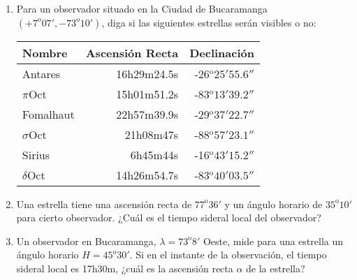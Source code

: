 \documentclass[a4paper,12pt]{article}
\begin{document}
\begin{enumerate}
  \item Para un observador situado en la Ciudad de Bucaramanga $(+7^\mathrm{o}
    07',-73^\mathrm{o} 10')$, diga si las siguientes estrellas serán visibles o
    no:\\

    \begin{center}
    \begin{tabular}{lrr}
      \hline
      {\bf Nombre} & {\bf Ascensión Recta} & {\bf Declinación} \\
      \hline
      Antares     & 16h29m24.5s     & -26$^\mathrm{o}25'55.6''$ \\ 
      $\pi$Oct    & 15h01m51.2s     & -83$^\mathrm{o}13'39.2''$ \\
      Fomalhaut  & 22h57m39.9s     & -29$^\mathrm{o}37'22.7''$ \\
      $\sigma$Oct & 21h08m47s       & -88$^\mathrm{o}57'23.1''$ \\
      Sirius      & 6h45m44s        & -16$^\mathrm{o}43'15.2''$ \\
      $\delta$Oct & 14h26m54.7s     & -83$^\mathrm{o}40'03.5''$ \\
      \hline
    \end{tabular}
    \end{center}

  \item Una estrella tiene una ascensión recta de $77^\mathrm{o}36'$ y un
    ángulo horario de $35^\mathrm{o}10'$ para cierto observador. ¿Cuál es el
    tiempo sideral local del observador?

  \item Un observador en Bucaramanga, $\lambda=73^\mathrm{o} 8'$ Oeste, mide para una estrella un ángulo horario $H=45^\mathrm{o}30'$. Si en el instante de la observación, el tiempo sideral local es 17h30m, ¿cuál es la ascensión recta $\alpha$ de la estrella?
    
\end{enumerate}
\end{document}
